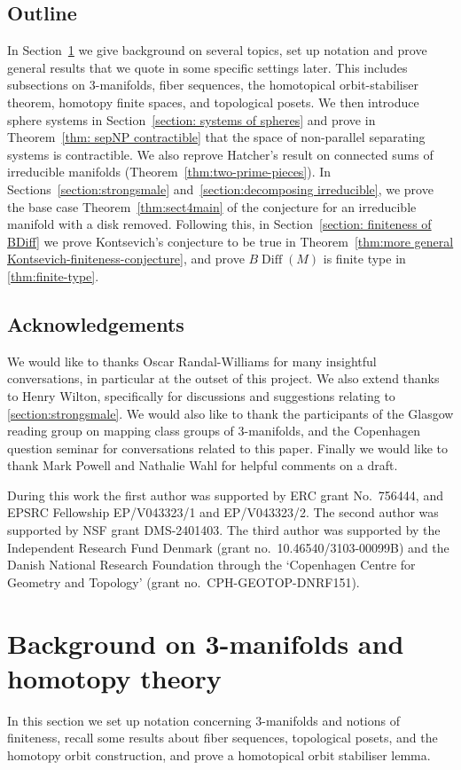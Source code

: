 \documentclass{amsart}
\theoremstyle{plain}
\theoremstyle{definition}
\DeclareMathOperator\Diff{Diff}
\newcommand{\BDiff}{B\!\Diff}
\begin{document}
\subsection{Outline}
In Section~\ref{section: preliminaries} we give background on several topics, set up notation and prove general results that we quote in some specific settings later. This includes subsections on 3-manifolds, fiber sequences, the homotopical orbit-stabiliser theorem, homotopy finite spaces, and topological posets. We then introduce sphere systems in Section~\ref{section: systems of spheres} and prove in Theorem~\ref{thm: sepNP contractible} that the space of non-parallel separating systems is contractible. We also reprove Hatcher's result on connected sums of irreducible manifolds (Theorem~\ref{thm:two-prime-pieces}).
In Sections~\ref{section:strongsmale} and~\ref{section:decomposing irreducible}, we prove the base case Theorem~\ref{thm:sect4main} of the conjecture for an irreducible manifold with a disk removed. 
Following this, in Section~\ref{section: finiteness of BDiff} we prove Kontsevich's conjecture to be true in Theorem~\ref{thm:more general Kontsevich-finiteness-conjecture}, and prove $\BDiff(M)$ is finite type in \cref{thm:finite-type}.

\subsection{Acknowledgements}
We would like to thanks Oscar Randal-Williams for many insightful conversations, in particular at the outset of this project. We also extend thanks to Henry Wilton, specifically for discussions and suggestions relating to \cref{section:strongsmale}.
We would also like to thank the participants of the Glasgow reading group on mapping class groups of 3-manifolds, and the Copenhagen question seminar for conversations related to this paper. Finally we would like to thank Mark Powell and Nathalie Wahl for helpful comments on a draft.

During this work the first author was supported by ERC grant No.~756444, and EPSRC Fellowship EP/V043323/1 and EP/V043323/2. 
The second author was supported by NSF grant DMS-2401403. 
The third author was supported by the Independent Research Fund Denmark (grant no.~10.46540/3103-00099B)
and the Danish National Research Foundation through the ‘Copenhagen Centre for Geometry and Topology’ (grant no.~CPH-GEOTOP-DNRF151).%
\section{Background on 3-manifolds and homotopy theory}\label{section: preliminaries}
In this section we set up notation concerning $3$-manifolds and notions of finiteness, recall some results about fiber sequences, topological posets, and the homotopy orbit construction, and prove a homotopical orbit stabiliser lemma.
\end{document}
